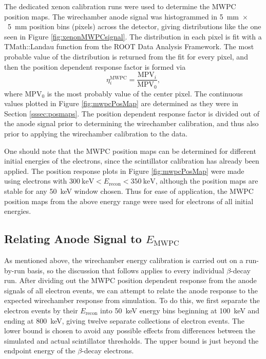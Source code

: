 The dedicated xenon calibration runs were used to determine the MWPC position maps.
The wirechamber anode signal was histogrammed in 5~mm~$\times$~5~mm position bins (pixels) across the detector,
giving distributions like the one seen in Figure \ref{fig:xenonMWPCsignal}. The distribution
in each pixel is fit with a TMath::Landau function from the ROOT Data Analysis Framework.
The most probable value of
the distribution is returned from the fit for every pixel, and then the position dependent response factor is formed
via
%
\begin{equation}
  \eta^{\mathrm{MWPC}}_i = \frac{\mathrm{MPV}_i}{\mathrm{MPV}_0},
\end{equation}
where $\mathrm{MPV}_0$ is the most probably value of the center pixel.
The continuous values plotted in Figure \ref{fig:mwpcPosMap} are determined as they were in
Section \ref{sssec:posmaps}. The position dependent response factor is divided out of the anode signal
prior to determining the wirechamber calibration, and thus also prior to applying the wirechamber
calibration to the data.

One should note that the MWPC position maps can be determined for different initial energies of the
electrons, since the scintillator calibration has already been applied. The position response plots
in Figure \ref{fig:mwpcPosMap} were made using electrons with $300\mathrm{~keV}<E_{\mathrm{recon}}<350\mathrm{~keV}$,
although the position maps are stable for any 50~keV window chosen. Thus for ease of application, the MWPC position
maps from the above energy range were used for electrons of all initial energies.


\subsection{Relating Anode Signal to $E_{\mathrm{MWPC}}$}

As mentioned above, the wirechamber energy calibration is carried out on a run-by-run basis, so
the discussion that follows applies to every individual $\beta$-decay run.
After dividing out the MWPC position dependent response from the anode signals of all electron events,
we can attempt to relate the anode response to the expected wirechamber response from simulation.
To do this, we first separate the electron events by their $E_{\mathrm{recon}}$ into 50~keV energy bins beginning at 100~keV and ending at
800~keV, giving twelve separate collections of electron events. The lower bound is chosen to avoid any possible
effects from differences between the simulated and actual scintillator thresholds. The upper bound is just beyond
the endpoint energy of the $\beta$-decay electrons.

